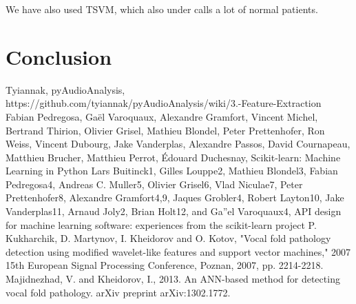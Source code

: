 \documentclass[conference]{IEEEtran}
\begin{document}
We have also used TSVM, which also under calls a lot of normal patients.


\section{Conclusion}



\begin{thebibliography}{00}
 Tyiannak, pyAudioAnalysis, https://github.com/tyiannak/pyAudioAnalysis/wiki/3.-Feature-Extraction
 Fabian Pedregosa, Gaël Varoquaux, Alexandre Gramfort, Vincent Michel, Bertrand Thirion, Olivier Grisel, Mathieu Blondel, Peter Prettenhofer, Ron Weiss, Vincent Dubourg, Jake Vanderplas, Alexandre Passos, David Cournapeau, Matthieu Brucher, Matthieu Perrot, Édouard Duchesnay, Scikit-learn: Machine Learning in Python
 Lars Buitinck1, Gilles Louppe2, Mathieu Blondel3, Fabian Pedregosa4, Andreas C. Muller5, Olivier Grisel6, Vlad Niculae7, Peter Prettenhofer8, Alexandre Gramfort4,9, Jaques Grobler4, Robert Layton10, Jake Vanderplas11, Arnaud Joly2, Brian Holt12, and Ga''el Varoquaux4, API design for machine learning software: experiences from the scikit-learn project
P. Kukharchik, D. Martynov, I. Kheidorov and O. Kotov, "Vocal fold pathology detection using modified wavelet-like features and support vector machines," 2007 15th European Signal Processing Conference, Poznan, 2007, pp. 2214-2218.
Majidnezhad, V. and Kheidorov, I., 2013. An ANN-based method for detecting vocal fold pathology. arXiv preprint arXiv:1302.1772.

\end{thebibliography}
\end{document}
